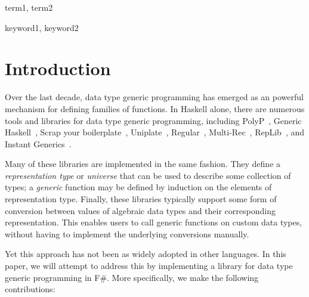 \documentclass{sigplanconf}
\begin{document}

\terms
term1, term2

\keywords
keyword1, keyword2

\section{Introduction}

Over the last decade, data type generic programming has emerged as an
powerful mechanism for defining families of functions. In Haskell
alone, there are numerous tools and libraries for data type generic
programming, including PolyP~\cite{polyp}, Generic
Haskell~\cite{GenericHaskell}, Scrap your boilerplate~\cite{SYB},
Uniplate~\cite{Uniplate}, Regular~\cite{Regular},
Multi-Rec~\cite{MultiRec}, RepLib~\cite{RepLib}, and Instant
Generics~\cite{instant2}.

Many of these libraries are implemented in the same fashion. They
define a \emph{representation type} or \emph{universe} that can be
used to describe some collection of types; a \emph{generic} function
may be defined by induction on the elements of representation
type. Finally, these libraries typically support some form of
conversion between values of algebraic data types and their
corresponding representation. This enables users to call generic
functions on custom data types, without having to implement the
underlying conversions manually.

Yet this approach has not been as widely adopted in other
languages. In this paper, we will attempt to address this by
implementing a library for data type generic programming in F\#. More
specifically, we make the following contributions:
\end{document}
